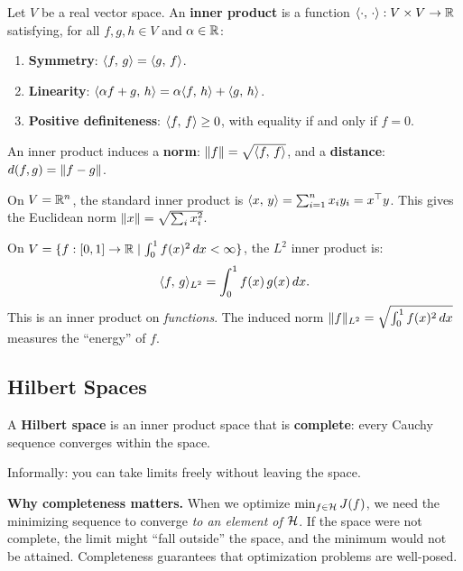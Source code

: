\begin{notechapter}
\begin{definitionbox}
Let $V$ be a real vector space. An \textbf{inner product} is a function
$\langle \cdot,\, \cdot \rangle: V \times V \to \mathbb{R}$ satisfying, for all $f, g, h
\in V$ and $\alpha \in \mathbb{R}$:
\begin{enumerate}[label=(\roman*)]
  \item \textbf{Symmetry}: $\langle f,\, g \rangle = \langle g,\, f \rangle$.
  \item \textbf{Linearity}: $\langle \alpha f + g,\, h \rangle =
  \alpha\langle f,\, h \rangle + \langle g,\, h \rangle$.
  \item \textbf{Positive definiteness}: $\langle f,\, f \rangle \geq 0$, with
  equality if and only if $f = 0$.
\end{enumerate}
An inner product induces a \textbf{norm}: $\| f \| =
\sqrt{\langle f,\, f \rangle}$, and a \textbf{distance}: $d(f,g) = \| f - g \|$.
\end{definitionbox}

\begin{examplebox}
On $V = \mathbb{R}^n$, the standard inner product is $\langle x,\, y \rangle =
\sum_{i=1}^n x_i y_i = x^\top y$. This gives the Euclidean norm
$\| x \| = \sqrt{\sum_i x_i^2}$.
\end{examplebox}

\begin{examplebox}
On $V = \{f:[0,1] \to \mathbb{R} \mid \int_0^1 f(x)^2\,dx < \infty\}$, the $L^2$
inner product is:
\[
\langle f,\, g \rangle_{L^2} = \int_0^1 f(x)\,g(x)\,dx.
\]
This is an inner product on \emph{functions}. The induced norm
$\| f \|_{L^2} = \sqrt{\int_0^1 f(x)^2\,dx}$ measures the ``energy'' of
$f$.
\end{examplebox}

\subsection{Hilbert Spaces}
\label{rkhs:subsec:hilbert}

\begin{definitionbox}
A \textbf{Hilbert space} is an inner product space that is
\textbf{complete}: every Cauchy sequence converges within the space.

Informally: you can take limits freely without leaving the space.
\end{definitionbox}

\textbf{Why completeness matters.} When we optimize $\min_{f \in \mathcal{H}}
J(f)$, we need the minimizing sequence to converge \emph{to an element
of $\mathcal{H}$}. If the space were not complete, the limit might ``fall
outside'' the space, and the minimum would not be attained. Completeness
guarantees that optimization problems are well-posed.


\end{notechapter}
